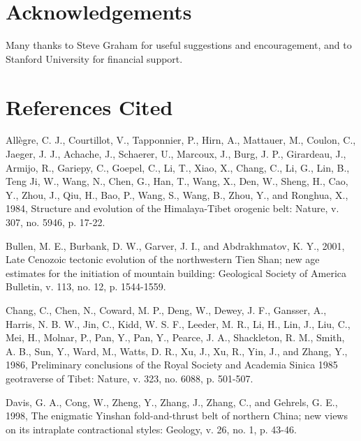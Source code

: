 \documentclass{article}
\begin{document}
 \section*{Acknowledgements}

 Many thanks to Steve Graham for useful suggestions and encouragement,
 and to Stanford University for financial support.

 \section*{References Cited}

 \begin{description}

 \item  All\`egre, C. J.,  Courtillot, V.,  Tapponnier, P.,  Hirn, A.,
 Mattauer, M., Coulon,  C., Jaeger, J. J., Achache,  J., Schaerer, U.,
 Marcoux, J.,  Burg, J.  P., Girardeau, J.,  Armijo, R.,  Gariepy, C.,
 Goepel, C.,  Li, T., Xiao, X., Chang,  C., Li, G., Lin,  B., Teng Ji,
 W., Wang, N.,  Chen, G., Han, T., Wang, X., Den,  W., Sheng, H., Cao,
 Y., Zhou,  J., Qiu, H.,  Bao, P., Wang,  S., Wang, B., Zhou,  Y., and
 Ronghua,  X., 1984,  Structure  and evolution  of the  Himalaya-Tibet
 orogenic belt: Nature, v. 307, no. 5946, p. 17-22.\\

 \item Bullen, M. E., Burbank, D. W., Garver, J. I., and Abdrakhmatov,
 K.  Y., 2001, Late  Cenozoic tectonic  evolution of  the northwestern
 Tien Shan; new age estimates for the initiation of mountain building:
 Geological   Society   of  America   Bulletin,   v.   113,  no.   12,
 p. 1544-1559.\\

 \item Chang,  C., Chen, N.,  Coward, M. P.,  Deng, W., Dewey,  J. F.,
 Gansser,  A., Harris,  N. B.  W., Jin,  C., Kidd,  W. S.  F., Leeder,
 M. R., Li, H.,  Lin, J., Liu, C., Mei, H., Molnar,  P., Pan, Y., Pan,
 Y., Pearce,  J. A., Shackleton, R.  M., Smith, A. B.,  Sun, Y., Ward,
 M.,  Watts, D. R.,  Xu, J.,  Xu, R.,  Yin, J.,  and Zhang,  Y., 1986,
 Preliminary conclusions of the Royal Society and Academia Sinica 1985
 geotraverse of Tibet: Nature, v. 323, no. 6088, p. 501-507.\\

 \item Davis,  G. A., Cong, W.,  Zheng, Y., Zhang, J.,  Zhang, C., and
 Gehrels, G.  E., 1998, The enigmatic Yinshan  fold-and-thrust belt of
 northern  China; new  views on  its intraplate  contractional styles:
 Geology, v. 26, no. 1, p. 43-46.\\


\end{description}
\end{document}
